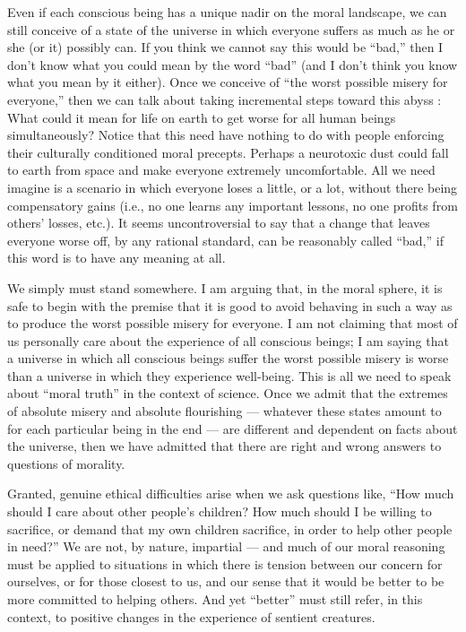 \documentclass[a4paper,14pt]{extbook}
\begin{document}
Even if each conscious being has a unique nadir on the moral landscape, we can still conceive of a state of the universe in which everyone suffers as much as he or she (or it) possibly can.
If you think we cannot say this would be ``bad,'' then I don't know what you could mean by the word ``bad'' (and I don't think you know what you mean by it either).
Once we conceive of ``the worst possible misery for everyone,'' then we can talk about taking incremental steps toward this abyss :
What could it mean for life on earth to get worse for all human beings simultaneously?
Notice that this need have nothing to do with people enforcing their culturally conditioned moral precepts.
Perhaps a neurotoxic dust could fall to earth from space and make everyone extremely uncomfortable.
All we need imagine is a scenario in which everyone loses a little, or a lot, without there being compensatory gains (i.e., no one learns any important lessons, no one profits from others' losses, etc.).
It seems uncontroversial to say that a change that leaves everyone worse off, by any rational standard, can be reasonably called ``bad,'' if this word is to have any meaning at all.

We simply must stand somewhere. I am arguing that, in the moral sphere, it is safe to begin with the premise that it is good to avoid behaving in such a way as to produce the worst possible misery for everyone.
I am not claiming that most of us personally care about the experience of all conscious beings;
I am saying that a universe in which all conscious beings suffer the worst possible misery is worse than a universe in which they experience well-being.
This is all we need to speak about ``moral truth'' in the context of science.
Once we admit that the extremes of absolute misery and absolute flourishing --- whatever these states amount to for each particular being in the end --- are different and dependent on facts about the universe, then we have admitted that there are right and wrong answers to questions of morality.

Granted, genuine ethical difficulties arise when we ask questions like, ``How much should I care about other people's children?
How much should I be willing to sacrifice, or demand that my own children sacrifice, in order to help other people in need?''
We are not, by nature, impartial --- and much of our moral reasoning must be applied to situations in which there is tension between our concern for ourselves, or for those closest to us, and our sense that it would be better to be more committed to helping others.
And yet ``better'' must still refer, in this context, to positive changes in the experience of sentient creatures.
\end{document}
